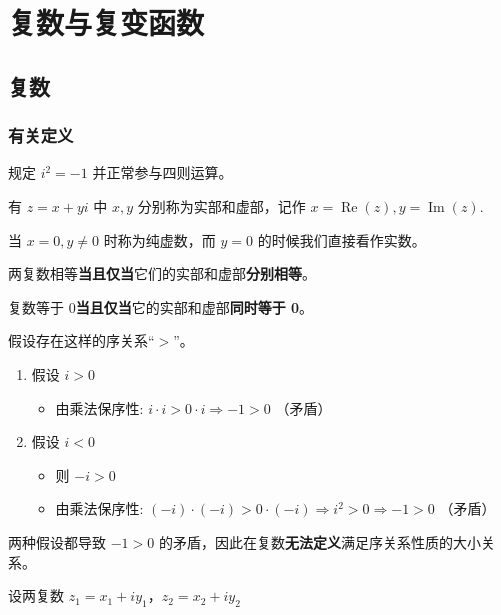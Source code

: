 \section{复数与复变函数}
\label{复数与复变函数}
\subsection{复数}
\label{复数}
\subsubsection{有关定义}
\label{有关定义}
规定 \(i^2=-1\) 并正常参与四则运算。

有 \(z=x+yi\) 中 \(x,y\) 分别称为实部和虚部，记作
\(x=\operatorname{Re}(z),y=\operatorname{Im}(z).\)

当 \(x=0,y \ne 0\) 时称为纯虚数，而 \(y=0\) 的时候我们直接看作实数。

两复数相等\textbf{当且仅当}它们的实部和虚部\textbf{分别相等}。

复数等于 0\textbf{当且仅当}它的实部和虚部\textbf{同时等于 0}。

\begin{tcolorbox}[title={复数中无法定义大小关系},colback=red!5!white
,colframe=red!75!black
,colbacktitle=yellow!50!red
,coltitle=red!25!black, fonttitle=\bfseries,subtitle style={boxrule=0.4pt, colback=yellow!50!red!25!white}]
假设存在这样的序关系“\(>\)”。

\begin{enumerate}
\item 假设 \(i > 0\)
\begin{itemize}
\item 由乘法保序性: \(i \cdot i > 0 \cdot i \Rightarrow -1 > 0\) （矛盾）
\end{itemize}
\item 假设 \(i < 0\)
\begin{itemize}
\item 则 \(-i > 0\)
\item 由乘法保序性: \((-i) \cdot (-i) > 0 \cdot (-i) \Rightarrow i^2 > 0 \Rightarrow -1 > 0\) （矛盾）
\end{itemize}
\end{enumerate}

两种假设都导致 \(-1 > 0\) 的矛盾，因此在复数\textbf{无法定义}满足序关系性质的大小关系。

\end{tcolorbox}

设两复数 \(z_{1}=x_{1}+iy_{1}\)，\(z_{2}=x_{2}+iy_{2}\)

